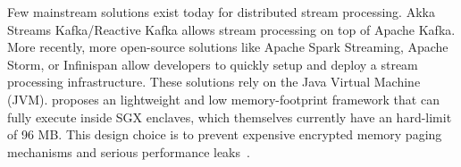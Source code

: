 Few mainstream solutions exist today for distributed stream processing.
Akka Streams Kafka/Reactive Kafka\cite{reactivekafka} allows stream processing on top of Apache Kafka\cite{apachekafka}.
More recently, more open-source solutions like Apache Spark Streaming\cite{apachesparkstreaming}, Apache Storm\cite{apachestorm}, or Infinispan\cite{infinispan} allow developers to quickly setup and deploy a stream processing infrastructure. 
These solutions rely on the Java Virtual Machine (JVM)\cite{}.
\SYS proposes an lightweight and low memory-footprint framework that can fully execute inside SGX enclaves, which themselves currently have an hard-limit of 96 MB.
This design choice is to prevent expensive encrypted memory paging mechanisms and serious performance leaks~\cite{brenner_securekeeper:_2016}.  


